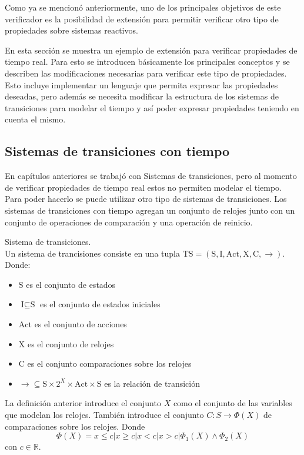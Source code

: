 Como ya se mencionó anteriormente, uno de los principales objetivos de este verificador
 es la posibilidad de extensión para permitir verificar otro tipo de propiedades sobre
 sistemas reactivos.

En esta sección se muestra un ejemplo de extensión para verificar propiedades de
 tiempo real.
Para esto se introducen básicamente los principales conceptos y se describen las
 modificaciones necesarias para verificar este tipo de propiedades.
Esto incluye implementar un lenguaje que
 permita expresar las propiedades deseadas, pero además se necesita modificar la
 estructura de los sistemas de transiciones para modelar el tiempo y así poder expresar
 propiedades teniendo en cuenta el mismo.

\subsection{Sistemas de transiciones con tiempo}
En capítulos anteriores se trabajó con Sistemas de transiciones, pero al momento de verificar
 propiedades de tiempo real estos no permiten modelar el tiempo.
Para poder hacerlo se puede utilizar otro tipo de sistemas de transiciones.
Los sistemas de transiciones con tiempo \cite{henzinger} agregan un conjunto de relojes junto con un
 conjunto de operaciones de comparación y una operación de reinicio.

\begin{definicion}
Sistema de transiciones.\\
Un sistema de trancisiones consiste en una tupla $\text{TS} = (\text{S}, \text{I}, \text{Act}, \text{X}, \text{C}, {\to})$. Donde:
\begin{itemize}
\item $\text{S}$ es el conjunto de estados
\item $\text{I} \subseteq \text{S}$ es el conjunto de estados iniciales
\item $\text{Act}$ es el conjunto de acciones
\item $\text{X}$ es el conjunto de relojes
\item $\text{C}$ es el conjunto comparaciones sobre los relojes
\item ${\to} \subseteq \text{S} \times 2^X \times \text{Act} \times \text{S}$ es la relación de transición
\end{itemize}
\end{definicion}

La definición anterior introduce el conjunto $X$ como el conjunto de las variables
 que modelan los relojes. También introduce el conjunto ${C : S \to {\Phi (X)}}$ de
 comparaciones sobre los relojes. Donde
\[ \Phi (X) = x \leq c | x \geq c | x < c | x > c | \Phi_1 (X) \land \Phi_2 (X) \]
con $c \in \mathbb{R}$.

